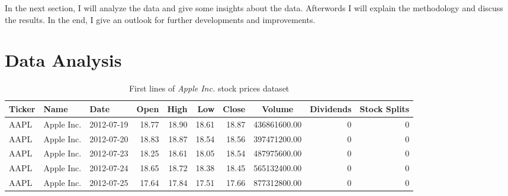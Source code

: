\documentclass[fleqn,10pt]{SelfArx} %
\begin{document}
In the next section, I will analyze the data and give some insights about the data. Afterwords I will explain the methodology and discuss the results. In the end, I give an outlook for further developments and improvements.


\section{Data Analysis}

\begin{table*}[hbt]
	\caption{First lines of \textit{Apple Inc.} stock prices dataset}
	\centering
\begin{tabular}{lllrrrr S[table-auto-round,table-format=9.0] rr}
\toprule
Ticker &       Name &       Date &  Open &  High &   Low &  Close &       {Volume} &  Dividends &  Stock Splits \\
\midrule
  AAPL & Apple Inc. & 2012-07-19 & 18.77 & 18.90 & 18.61 &  18.87 & 436861600.00 &       0 &          0 \\
  AAPL & Apple Inc. & 2012-07-20 & 18.83 & 18.87 & 18.54 &  18.56 & 397471200.00 &       0 &          0 \\
  AAPL & Apple Inc. & 2012-07-23 & 18.25 & 18.61 & 18.05 &  18.54 & 487975600.00 &       0 &          0 \\
  AAPL & Apple Inc. & 2012-07-24 & 18.65 & 18.72 & 18.38 &  18.45 & 565132400.00 &       0 &          0 \\
  AAPL & Apple Inc. & 2012-07-25 & 17.64 & 17.84 & 17.51 &  17.66 & 877312800.00 &       0 &          0 \\
\bottomrule
\end{tabular}
	\label{tab:df.head}
\end{table*}
\end{document}

